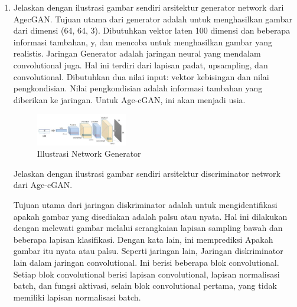\begin{enumerate}
\begin{figure}[H]
	\end{figure}
	\item Jelaskan dengan ilustrasi gambar sendiri arsitektur generator network dari AgecGAN.
	\hfill \break
	Tujuan utama dari generator adalah untuk menghasilkan gambar dari dimensi (64, 64, 3). Dibutuhkan vektor laten 100 dimensi dan beberapa informasi tambahan, y, dan mencoba untuk menghasilkan gambar yang realistis. Jaringan Generator adalah jaringan neural yang mendalam convolutional juga. Hal ini terdiri dari lapisan padat, upsampling, dan convolutional. Dibutuhkan dua nilai input: vektor kebisingan dan nilai pengkondisian. Nilai pengkondisian adalah informasi tambahan yang diberikan ke jaringan. Untuk Age-cGAN, ini akan menjadi usia. 
	\begin{figure}[H]
		\includegraphics[width=4cm]{figures/1174003/9/teori4.PNG}
		\centering
		\caption{Illustrasi Network Generator}
	\end{figure}
	Jelaskan dengan ilustrasi gambar sendiri arsitektur discriminator network dari Age-cGAN.
	\hfill \break


	Tujuan utama dari jaringan diskriminator adalah untuk mengidentifikasi apakah gambar yang disediakan adalah palsu atau nyata. Hal ini dilakukan dengan melewati gambar melalui serangkaian lapisan sampling bawah dan beberapa lapisan klasifikasi. Dengan kata lain, ini memprediksi Apakah gambar itu nyata atau palsu. Seperti jaringan lain, Jaringan diskriminator lain dalam jaringan convolutional. Ini berisi beberapa blok convolutional. Setiap blok convolutional berisi lapisan convolutional, lapisan normalisasi batch, dan fungsi aktivasi, selain blok convolutional pertama, yang tidak memiliki lapisan normalisasi batch. 
		

\end{enumerate}
